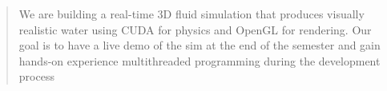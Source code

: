 \begin{abstract}

We are building a real-time 3D fluid simulation 
that produces visually realistic water using CUDA for physics 
and OpenGL for rendering. Our goal is to have a live demo of the
sim at the end of the semester and gain hands-on experience 
multithreaded programming during the development process

\end{abstract}

